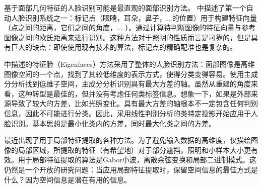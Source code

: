 \documentclass[UTF8]{ctexart}
\begin{document}
基于面部几何特征的人脸识别可能是最直观的面部识别方法。 \cite{Kanade1973}中描述了第一个自动人脸识别系统之一：标记点（眼睛，耳朵，鼻子，...的位置）用于构建特征向量（点之间的距离，它们之间的角度，... ）。通过计算待判断图像的特征向量与参考图像之间的欧氏距离来进行识别。这种方法对于照明的性质而言是可靠的，但是具有巨大的缺点：即使使用现有技术的算法，标记点的精确配准也是复杂的。

\cite{Turk1991}中描述的特征脸（Eigenfaces）方法采用了整体的人脸识别方法：面部图像是高维图像空间的一个点，找到了其较低维度的表示方式，使得分类变得容易。使用主成分分析找到低维子空间，主成分分析识别具有最大方差的轴。虽然从重建的角度来看，这种转型是最佳的，但并没有考虑任何类标签信息。想象一下，如果是外部来源导致了较大的方差，比如光照变化。具有最大方差的轴根本不一定包含任何判别信息，因此不可能进行分类。因此，采用线性判别分析的类特定投影开始应用于人脸识别\cite{Belhumeur1997}。基本思想是最小化类内的方差，同时最大化类之间的方差。

最近出现了用于局部特征提取的各种方法。为了避免输入数据的高维度，仅描绘图像的局部区域，所提取的特征（有希望地）对于部分遮挡，照明和小样本大小更有效。用于局部特征提取的算法是Gabor小波\cite{Wiskott1997}，离散余弦变换\cite{Messer2005}和局部二进制模式\cite{Ahonen2004}。这仍然是一个开放的研究问题：当应用局部特征提取时，保留空间信息的最佳方式是什么？因为空间信息是潜在有用的信息。
\end{document}
